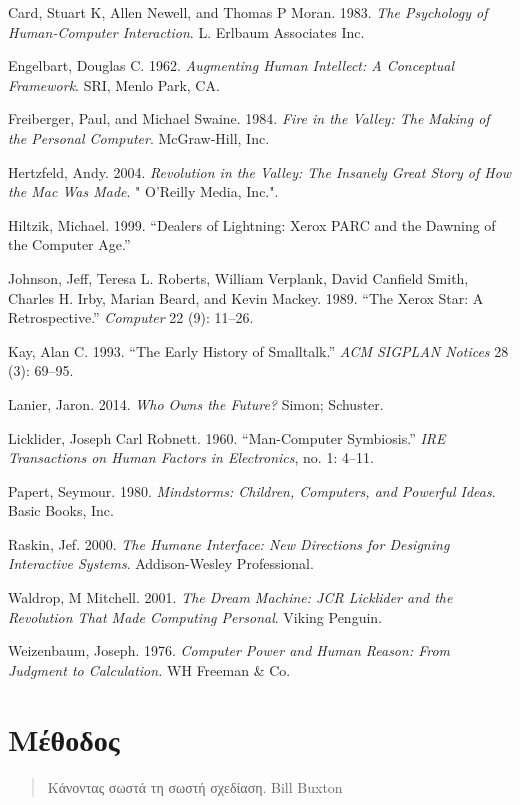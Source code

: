\documentclass[
]{article}
\begin{document}
Card, Stuart K, Allen Newell, and Thomas P Moran. 1983. \emph{The
Psychology of Human-Computer Interaction}. L. Erlbaum Associates Inc.

Engelbart, Douglas C. 1962. \emph{Augmenting Human Intellect: A
Conceptual Framework}. SRI, Menlo Park, CA.

Freiberger, Paul, and Michael Swaine. 1984. \emph{Fire in the Valley:
The Making of the Personal Computer}. McGraw-Hill, Inc.

Hertzfeld, Andy. 2004. \emph{Revolution in the Valley: The Insanely
Great Story of How the Mac Was Made}. " O'Reilly Media, Inc.".

Hiltzik, Michael. 1999. {``Dealers of Lightning: Xerox PARC and the
Dawning of the Computer Age.''}

Johnson, Jeff, Teresa L. Roberts, William Verplank, David Canfield
Smith, Charles H. Irby, Marian Beard, and Kevin Mackey. 1989. {``The
Xerox Star: A Retrospective.''} \emph{Computer} 22 (9): 11--26.

Kay, Alan C. 1993. {``The Early History of Smalltalk.''} \emph{ACM
SIGPLAN Notices} 28 (3): 69--95.

Lanier, Jaron. 2014. \emph{Who Owns the Future?} Simon; Schuster.

Licklider, Joseph Carl Robnett. 1960. {``Man-Computer Symbiosis.''}
\emph{IRE Transactions on Human Factors in Electronics}, no. 1: 4--11.

Papert, Seymour. 1980. \emph{Mindstorms: Children, Computers, and
Powerful Ideas}. Basic Books, Inc.

Raskin, Jef. 2000. \emph{The Humane Interface: New Directions for
Designing Interactive Systems}. Addison-Wesley Professional.

Waldrop, M Mitchell. 2001. \emph{The Dream Machine: JCR Licklider and
the Revolution That Made Computing Personal}. Viking Penguin.

Weizenbaum, Joseph. 1976. \emph{Computer Power and Human Reason: From
Judgment to Calculation.} WH Freeman \& Co.

\hypertarget{ux3bcux3adux3b8ux3bfux3b4ux3bfux3c2}{%
\section{Μέθοδος}\label{ux3bcux3adux3b8ux3bfux3b4ux3bfux3c2}}

\begin{quote}
Κάνοντας σωστά τη σωστή σχεδίαση. Bill Buxton
\end{quote}
\end{document}
